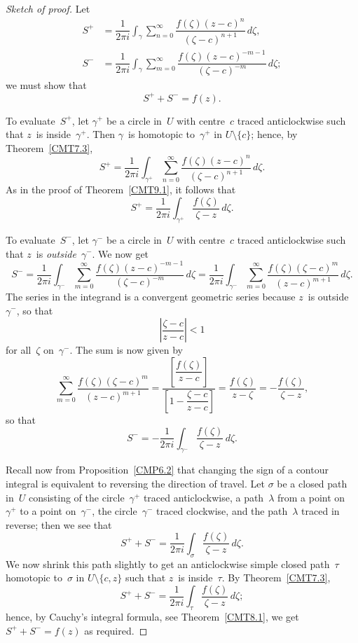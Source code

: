 \documentclass{amsproc}
\theoremstyle{definition}
\theoremstyle{remark}
\numberwithin{equation}{section}
\begin{document}
\begin{proof}[Sketch of proof]
Let
\begin{align*}
S^+ &= \dfrac{1}{2\pi i} \int_\gamma \sum_{n = 0}^\infty \dfrac{f(\zeta)(z - c)^n}{(\zeta - c)^{n + 1}}\,d\zeta, \\
S^- &= \dfrac{1}{2\pi i} \int_\gamma \sum_{m = 0}^\infty \dfrac{f(\zeta)(z - c)^{-m - 1}}{(\zeta - c)^{-m}}\,d\zeta;
\end{align*}
we must show that
$$
S^+ + S^- = f(z).
$$

To evaluate~$ S^+ $, let $ \gamma^+ $ be a circle in~$ U $ with centre~$ c $ traced anticlockwise such that $ z $~is inside~$ \gamma^+ $. Then $ \gamma $~is homotopic
to~$ \gamma^+ $ in $ U \setminus \{c\} $; hence, by Theorem~\ref{CMT7.3},
$$
S^+ = \dfrac{1}{2\pi i} \int_{\gamma^+} \sum_{n = 0}^\infty \dfrac{f(\zeta)(z - c)^n}{(\zeta - c)^{n + 1}}\,d\zeta.
$$
As in the proof of Theorem~\ref{CMT9.1}, it follows that
$$
S^+ = \dfrac{1}{2\pi i} \int_{\gamma^+} \dfrac{f(\zeta)}{\zeta - z}\,d\zeta.
$$

To evaluate~$ S^- $, let $ \gamma^- $ be a circle in~$ U $ with centre~$ c $ traced anticlockwise such that $ z $~is \emph{outside}~$ \gamma^- $. We now get
$$
S^- = \dfrac{1}{2\pi i} \int_{\gamma^-} \sum_{m = 0}^\infty \dfrac{f(\zeta)(z - c)^{-m - 1}}{(\zeta - c)^{-m}}\,d\zeta
= \dfrac{1}{2\pi i} \int_{\gamma^-}\sum_{m = 0}^\infty \dfrac{f(\zeta)(\zeta - c)^m}{(z - c)^{m + 1}}\,d\zeta.
$$
The series in the integrand is a convergent geometric series because $ z $~is outside~$ \gamma^- $, so that
$$
\left|\dfrac{\zeta - c}{z - c}\right| < 1
$$
for all~$ \zeta $ on~$ \gamma^- $. The sum is now given by
$$
\sum_{m = 0}^\infty \dfrac{f(\zeta)(\zeta - c)^m}{(z - c)^{m + 1}} = \dfrac{\left[\dfrac{f(\zeta)}{z - c}\right]}{\left[1 - \dfrac{\zeta - c}{z - c}\right]}
= \dfrac{f(\zeta)}{z - \zeta}
= -\dfrac{f(\zeta)}{\zeta - z},
$$
so that
$$
S^-= -\dfrac{1}{2\pi i} \int_{\gamma^-} \dfrac{f(\zeta)}{\zeta - z}\,d\zeta.
$$

Recall now from Proposition~\ref{CMP6.2} that changing the sign of a contour integral is equivalent to reversing the direction of travel. Let $ \sigma $ be a closed path in~$ U $ consisting of the circle~$ \gamma^+ $ traced anticlockwise, a path~$ \lambda $ from a point on~$ \gamma^+ $ to a point on~$ \gamma^- $, the circle~$ \gamma^- $ traced clockwise, and
the path~$ \lambda $ traced in reverse; then we see that
$$
S^+ + S^- = \dfrac{1}{2\pi i} \int_\sigma \dfrac{f(\zeta)}{\zeta - z}\,d\zeta.
$$
We now shrink this path slightly to get an anticlockwise simple closed path~$\tau$ homotopic to~$ \sigma $ in $ U \setminus \{c,z\} $ such that $ z $~is inside~$ \tau $.
By Theorem~\ref{CMT7.3},
$$
S^+ + S^- = \dfrac{1}{2\pi i} \int_\tau \dfrac{f(\zeta)}{\zeta - z}\,d\zeta;
$$
hence, by Cauchy's integral formula, see Theorem~\ref{CMT8.1}, we get $ S^+ +S^- = f(z) $ as required.
\end{proof}
\end{document}
